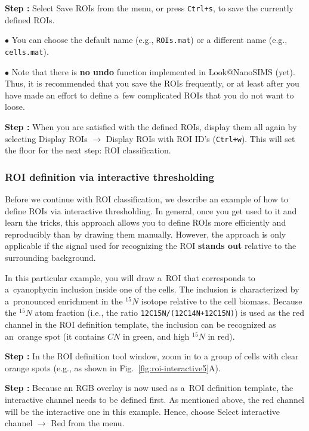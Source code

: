 \documentclass[a4paper, 11pt]{article}
\newcommand{\ttt}[1]{\texttt{#1}}
\newcommand{\lans}[1]{{\color{magenta}#1}}
\newcommand\ra{\rightarrow}
\newcounter{step}
\newcommand\s{\addtocounter{step}{1}\vskip5pt\noindent\textbf{Step \thestep:}{ }}
\newcommand\bul{\vskip5pt\noindent$\bullet${ }}
\newcommand\bb[1]{\textbf{#1}}
\begin{document}
\s Select \lans{Save ROIs} from the menu, or press \ttt{Ctrl+s}, to save the currently defined ROIs. 

\bul You can choose the default name (e.g., \ttt{ROIs.mat}) or a different name (e.g., \ttt{cells.mat}).

\bul Note that there is \bb{no undo} function implemented in Look@NanoSIMS (yet). Thus, it is recommended that you save the ROIs frequently, or at least after you have made an effort to define a~few complicated ROIs that you do not want to loose.

\s When you are satisfied with the defined ROIs, display them all again by selecting \lans{Display ROIs} $\ra$ \lans{Display ROIs with ROI ID's} (\ttt{Ctrl+w}). This will set the floor for the next step: ROI classification.


\subsubsection{ROI definition via interactive thresholding}
\setcounter{step}{0}

Before we continue with ROI classification, we describe an example of how to define ROIs via interactive thresholding. In general, once you get used to it and learn the tricks, this approach allows you to define ROIs more efficiently and reproducibly than by drawing them manually. However, the approach is only applicable if the signal used for recognizing the ROI \bb{stands out} relative to the surrounding background.

In this particular example, you will draw a~ROI that corresponds to a~cyanophycin inclusion inside one of the cells. The inclusion is characterized by a~pronounced enrichment in the ${}^{15}N$ isotope relative to the cell biomass. Because the ${}^{15}N$ atom fraction (i.e., the ratio \ttt{12C15N/(12C14N+12C15N)}) is used as the red channel in the ROI definition template, the inclusion can be recognized as an~orange spot (it contains $CN$ in green, and high ${}^{15}N$ in red).

\s In the ROI definition tool window, zoom in to a group of cells with clear orange spots (e.g., as shown in Fig.~\ref{fig:roi-interactive5}A).

\s Because an RGB overlay is now used as a~ROI definition template, the interactive channel needs to be defined first. As mentioned above, the red channel will be the interactive one in this example. Hence, choose \lans{Select interactive channel} $\ra$ \lans{Red} from the menu. 
\end{document}
